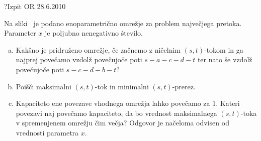 \begin{naloga}{?}{Izpit OR 28.6.2010}
\begin{vprasanje}
Na sliki~\fig{} je podano enoparametrično omrežje
za problem največjega pretoka.
Parameter $x$ je poljubno nenegativno število.

\begin{enumerate}[(a)]
\item Kakšno je pridruženo omrežje,
če začnemo z ničelnim $(s, t)$-tokom
in ga najprej povečamo vzdolž povečujoče poti $s-a-c-d-t$
ter nato še vzdolž povečujoče poti $s-c-d-b-t$?

\item Poišči maksimalni $(s, t)$-tok in minimalni $(s, t)$-prerez.

\item Kapaciteto ene povezave vhodnega omrežja lahko povečamo za $1$.
Kateri povezavi naj povečamo kapaciteto,
da bo vrednost maksimalnega $(s, t)$-toka v spremenjenem omrežju čim večja?
Odgovor je načeloma odvisen od vred\-no\-sti parametra $x$.
\end{enumerate}

\begin{slika}
\pgfslika
{}
\end{slika}
\end{vprasanje}
\begin{odgovor}
\end{odgovor}
\end{naloga}
